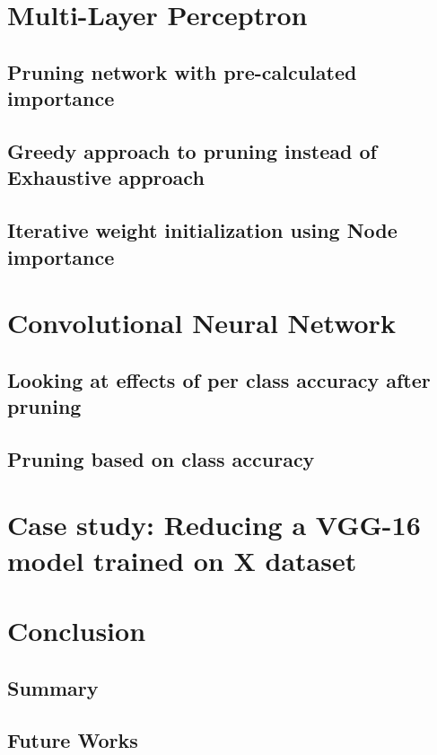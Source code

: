 \documentclass[UKenglish]{ifimaster}
\begin{document}
\chapter{Multi-Layer Perceptron}
    \section{Pruning network with pre-calculated importance}


    \section{Greedy approach to pruning instead of Exhaustive approach}


    \section{Iterative weight initialization using Node importance}



\chapter{Convolutional Neural Network}
    \section{Looking at effects of per class accuracy after pruning}


    \section{Pruning based on class accuracy}


\chapter{Case study: Reducing a VGG-16 model trained on X dataset}

\chapter{Conclusion}
    \section{Summary}


    \section{Future Works}


\backmatter{}
\printbibliography
\end{document}
